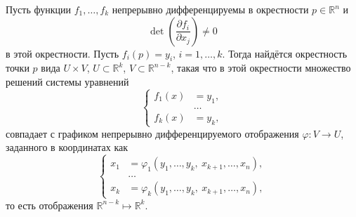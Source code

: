 \begin{to_thr}
\label{thr_6.32}
     Пусть функции $f_1, \ldots, f_k$ непрерывно дифференцируемы в окрестности $p \in \mathbb{R}^n$ и 
    \begin{equation*}
        \det \left(
            \frac{\partial f_i}{\partial x_j} 
        \right) \neq 0
    \end{equation*}
    в этой окрестности. Пусть $f_i(p) = y_i$, $i = 1, \ldots, k$. Тогда найдётся окрестность точки $p$ вида $U \times V$, $U \subset \mathbb{R}^k$, $V \subset \mathbb{R}^{n-k}$, такая что в этой окрестности множество решений системы уравнений
    \begin{equation*}
        \left\{\begin{aligned}
            f_1(x) &= y_1, \\
            &\ldots \\
            f_k(x) &= y_k,
        \end{aligned}\right.
    \end{equation*}
    совпадает с графиком непрерывно дифференцируемого отображения $\varphi \colon V \to U$, заданного в координатах как
    \begin{equation*}
        \left\{\begin{aligned}
            x_1 &= \varphi_1 (y_1, \ldots, y_k,\ x_{k+1}, \ldots, x_n),\\
            &\ldots\\
            x_k &= \varphi_k (y_1, \ldots, y_k,\ x_{k+1}, \ldots, x_n),
        \end{aligned}\right.
    \end{equation*}
    то есть отображения $\mathbb{R}^{n-k} \mapsto \mathbb{R}^k$.
\end{to_thr}

